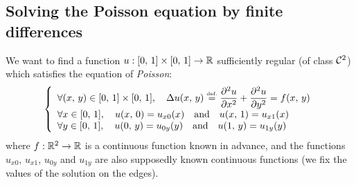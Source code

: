 \subsection{Solving the Poisson equation by finite differences}
\label{sect2-resol-eq-Poisson} 
 
 
  We want to find a function $ u: [0, \, 1] \times [0, \, 1] \rightarrow \mathbb{R} $ sufficiently regular (of class $ \mathcal{C}^2 $) which satisfies the equation of \textit{Poisson}:
\begin{equation}
\label{eq-fish}
\left\{\begin{array}{l} \forall (x, \, y) \in [0, \, 1] \times [0, \, 1], \quad \displaystyle{\Delta u (x , \, y) \ensuremath{\stackrel{\mbox{\upshape\tiny def.}}{=}} \frac{ \partial^2 u}{\partial x^2}  +  \frac{ \partial^2 u}{\partial y^2}  = f(x, \, y)} \\\forall x \in [0, \, 1], \quad u (x, \, 0) = u_{x0} (x) \quad \text{and} \quad u (x, \, 1) = u_{x1} (x) \\\forall y \in [ 0, \, 1], \quad u (0, \, y) = u_{0y} (y) \quad \text{and} \quad u (1, \, y) = u_{1y} (y) \end{array} \right.
\end{equation}
where $ f: \mathbb{R}^2 \rightarrow \mathbb{R} $ is a continuous function known in advance, and the functions $ u_{x0} $, $ u_{x1} $, $ u_{0y} $ and $ u_{1y} $ are also supposedly known continuous functions (we fix the values of the solution on the edges).
 
